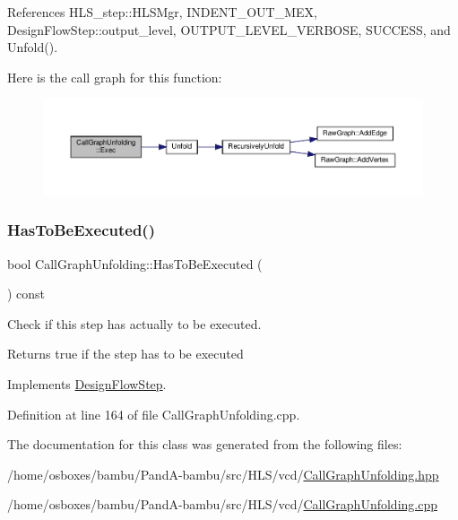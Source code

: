 References H\+L\+S\+\_\+step\+::\+H\+L\+S\+Mgr, I\+N\+D\+E\+N\+T\+\_\+\+O\+U\+T\+\_\+\+M\+EX, Design\+Flow\+Step\+::output\+\_\+level, O\+U\+T\+P\+U\+T\+\_\+\+L\+E\+V\+E\+L\+\_\+\+V\+E\+R\+B\+O\+SE, S\+U\+C\+C\+E\+SS, and Unfold().

Here is the call graph for this function\+:
\nopagebreak
\begin{figure}[H]
\begin{center}
\leavevmode
\includegraphics[width=350pt]{dc/d3d/classCallGraphUnfolding_a22a28a943380b9859f6006542f1929ab_cgraph}
\end{center}
\end{figure}
\mbox{\label{classCallGraphUnfolding_a27dfc396f756a66bfa689002aac9b943}} 
\subsubsection{\texorpdfstring{Has\+To\+Be\+Executed()}{HasToBeExecuted()}}
{\footnotesize\ttfamily bool Call\+Graph\+Unfolding\+::\+Has\+To\+Be\+Executed (\begin{DoxyParamCaption}{ }\end{DoxyParamCaption}) const\hspace{0.3cm}{\ttfamily [virtual]}}



Check if this step has actually to be executed. 

\begin{DoxyReturn}{Returns}
true if the step has to be executed 
\end{DoxyReturn}


Implements \hyperlink{classDesignFlowStep_a1783abe0c1d162a52da1e413d5d1ef05}{Design\+Flow\+Step}.



Definition at line 164 of file Call\+Graph\+Unfolding.\+cpp.



The documentation for this class was generated from the following files\+:\begin{DoxyCompactItemize}
\item 
/home/osboxes/bambu/\+Pand\+A-\/bambu/src/\+H\+L\+S/vcd/\hyperlink{CallGraphUnfolding_8hpp}{Call\+Graph\+Unfolding.\+hpp}\item 
/home/osboxes/bambu/\+Pand\+A-\/bambu/src/\+H\+L\+S/vcd/\hyperlink{CallGraphUnfolding_8cpp}{Call\+Graph\+Unfolding.\+cpp}\end{DoxyCompactItemize}
